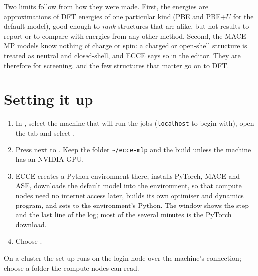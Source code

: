 Two limits follow from how they were made. First, the energies are approximations of DFT energies of one particular kind (PBE and PBE+$U$ for the default model), good enough to \emph{rank} structures that are alike, but not results to report or to compare with energies from any other method. Second, the MACE-MP models know nothing of charge or spin: a charged or open-shell structure is treated as neutral and closed-shell, and ECCE says so in the editor. They are therefore for screening, and the few structures that matter go on to DFT.

\section{Setting it up}
\begin{enumerate}
	\item In , select the machine that will run the jobs (\texttt{localhost} to begin with), open the  tab and select .
	\item Press  next to . Keep the folder \texttt{\textasciitilde/ecce-mlp} and the  build unless the machine has an NVIDIA GPU.
	\item ECCE creates a Python environment there, installs PyTorch, MACE and ASE, downloads the default model into the environment, so that compute nodes need no internet access later, builds its own optimiser and dynamics program, and sets  to the environment's Python. The window shows the step and the last line of the log; most of the several minutes is the PyTorch download.
	\item Choose .
\end{enumerate}
On a cluster the set-up runs on the login node over the machine's connection; choose a folder the compute nodes can read.

